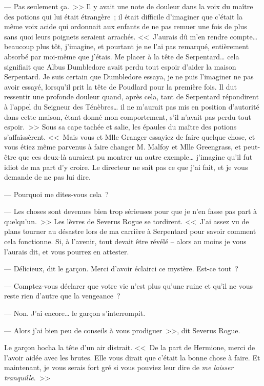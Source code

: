 --- Pas seulement ça.~>> Il y avait une note de douleur dans la voix du maître des potions qui lui était étrangère~; il était difficile d'imaginer que c'était la même voix acide qui ordonnait aux enfants de ne pas remuer une fois de plus sans quoi leurs poignets seraient arrachés. <<~J'aurais dû m'en rendre compte… beaucoup plus tôt, j'imagine, et pourtant je ne l'ai pas remarqué, entièrement absorbé par moi-même que j'étais. Me placer à la tête de Serpentard… cela signifiait que Albus Dumbledore avait perdu tout espoir d'aider la maison Serpentard. Je suis certain que Dumbledore essaya, je ne puis l'imaginer ne pas avoir essayé, lorsqu'il prit la tête de Poudlard pour la première fois. Il dut ressentir une profonde douleur quand, après cela, tant de Serpentard répondirent à l'appel du Seigneur des Ténèbres… il ne m'aurait pas mis en position d'autorité dans cette maison, étant donné mon comportement, s'il n'avait pas perdu tout espoir.~>> Sous sa cape tachée et salie, les épaules du maître des potions s'affaissèrent. <<~Mais vous et Mlle Granger essayiez de faire quelque chose, et vous étiez même parvenus à faire changer M. Malfoy et Mlle Greengrass, et peut-être que ces deux-là auraient pu montrer un autre exemple… j'imagine qu'il fut idiot de ma part d'y croire. Le directeur ne sait pas ce que j'ai fait, et je vous demande de ne pas lui dire.

--- Pourquoi me dites-vous cela~?

--- Les choses sont devenues bien trop sérieuses pour que je n'en fasse pas part à quelqu'un.~>> Les lèvres de Severus Rogue se tordirent. <<~J'ai assez vu de plans tourner au désastre lors de ma carrière à Serpentard pour savoir comment cela fonctionne. Si, à l'avenir, tout devait être révélé -- alors au moins je vous l'aurais dit, et vous pourrez en attester.

--- Délicieux, dit le garçon. Merci d'avoir éclairci ce mystère. Est-ce tout~?

--- Comptez-vous déclarer que votre vie n'est plus qu'une ruine et qu'il ne vous reste rien d'autre que la vengeance~?

--- Non. J'ai encore… le garçon s'interrompit.

--- Alors j'ai bien peu de conseils à vous prodiguer~>>, dit Severus Rogue.

Le garçon hocha la tête d'un air distrait. <<~De la part de Hermione, merci de l'avoir aidée avec les brutes. Elle vous dirait que c'était la bonne chose à faire. Et maintenant, je vous serais fort gré si vous pouviez leur dire de \emph{me laisser tranquille}.~>>

